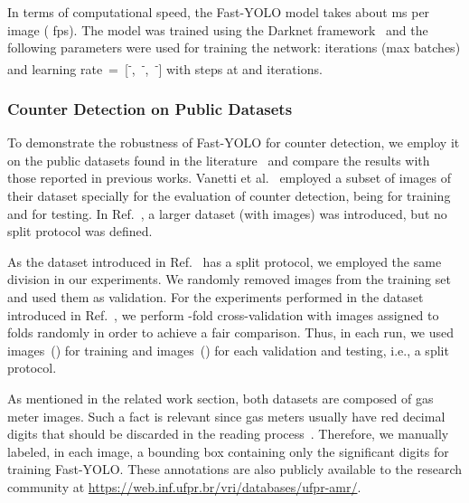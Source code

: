In terms of computational speed, the Fast-YOLO model takes about  ms per image ( \gls*{fps}). The model was trained using the Darknet framework~\cite{darknet13} and the following parameters were used for training the network:  iterations (max batches) and learning rate~=~[\textsuperscript{-},~\textsuperscript{-},~\textsuperscript{-}] with steps at  and  iterations.

\subsubsection{Counter Detection on Public Datasets}

To demonstrate the robustness of Fast-YOLO for counter detection, we employ it on the public datasets found in the literature~\cite{vanetti2013gas,goncalves2016reconhecimento} and compare the results with those reported in previous works.
Vanetti et al.~\cite{vanetti2013gas} employed a subset of  images of their dataset specially for the evaluation of counter detection, being  for training and  for testing. In Ref.~, a larger dataset (with  images) was introduced, but no split protocol was defined.

As the dataset introduced in Ref.~ has a split protocol, we employed the same division in our experiments. We randomly removed  images from the training set and used them as validation. For the experiments performed in the dataset introduced in Ref.~, we perform -fold cross-validation with images assigned to folds randomly in order to achieve a fair comparison. Thus, in each run, we used  images~() for training and  images~() for each validation and testing, i.e., a  split protocol. 

As mentioned in the related work section, both datasets are composed of gas meter images.
Such a fact is relevant since gas meters usually have red decimal digits that should be discarded in the reading process~\cite{vanetti2013gas,gallo2015robust,goncalves2016reconhecimento,gomez2018cutting}. Therefore, we manually labeled, in each image, a bounding box containing only the significant digits for training Fast-YOLO. These annotations are also publicly available to the research community at \small \url{https://web.inf.ufpr.br/vri/databases/ufpr-amr/}\normalsize.

